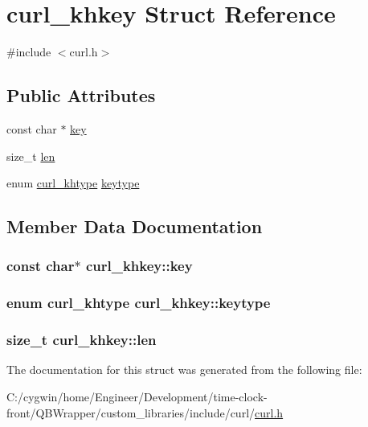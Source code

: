 \hypertarget{structcurl__khkey}{}\section{curl\+\_\+khkey Struct Reference}
\label{structcurl__khkey}


{\ttfamily \#include $<$curl.\+h$>$}

\subsection*{Public Attributes}
\begin{DoxyCompactItemize}
\item 
const char $\ast$ \hyperlink{structcurl__khkey_ab6dc0c5de64ec75832ac1984ec243087}{key}
\item 
size\+\_\+t \hyperlink{structcurl__khkey_abb9d6b5435d96a5abc8dbb1e29cbee4e}{len}
\item 
enum \hyperlink{curl_8h_ad99a943e7fdfac731261a696fbc8b526}{curl\+\_\+khtype} \hyperlink{structcurl__khkey_aebcbb84554e2e574d209132be43697f8}{keytype}
\end{DoxyCompactItemize}


\subsection{Member Data Documentation}
\hypertarget{structcurl__khkey_ab6dc0c5de64ec75832ac1984ec243087}{}
\subsubsection[{key}]{\setlength{\rightskip}{0pt plus 5cm}const char$\ast$ curl\+\_\+khkey\+::key}\label{structcurl__khkey_ab6dc0c5de64ec75832ac1984ec243087}
\hypertarget{structcurl__khkey_aebcbb84554e2e574d209132be43697f8}{}
\subsubsection[{keytype}]{\setlength{\rightskip}{0pt plus 5cm}enum {\bf curl\+\_\+khtype} curl\+\_\+khkey\+::keytype}\label{structcurl__khkey_aebcbb84554e2e574d209132be43697f8}
\hypertarget{structcurl__khkey_abb9d6b5435d96a5abc8dbb1e29cbee4e}{}
\subsubsection[{len}]{\setlength{\rightskip}{0pt plus 5cm}size\+\_\+t curl\+\_\+khkey\+::len}\label{structcurl__khkey_abb9d6b5435d96a5abc8dbb1e29cbee4e}


The documentation for this struct was generated from the following file\+:\begin{DoxyCompactItemize}
\item 
C\+:/cygwin/home/\+Engineer/\+Development/time-\/clock-\/front/\+Q\+B\+Wrapper/custom\+\_\+libraries/include/curl/\hyperlink{curl_8h}{curl.\+h}\end{DoxyCompactItemize}

